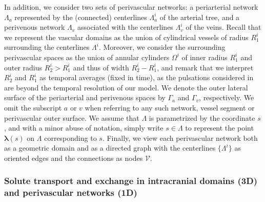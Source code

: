\documentclass[fleqn,10pt]{wlscirep}
\begin{document}
In addition, we consider two sets of perivascular networks: a
periarterial network $\Lambda_a$ represented by the (connected)
centerlines $\Lambda^i_{a}$ of the arterial tree, and a perivenous
network $\Lambda_v$ associated with the centerlines $\Lambda^i_{v}$
of the veins. Recall that we represent the vascular domains as the
union of cylindrical vessels of radius $R_1^i$ surrounding the
centerlines $\Lambda^i$. Moreover, we consider the surrounding
perivascular spaces as the union of annular cylinders $\Omega^i$ of
inner radius $R_1^i$ and outer radius $R_2^i > R_1^i$ and thus of
width $R_2^i - R_1^i$, and remark that we interpret $R^i_2$ and $R^i_1$ as temporal averages (fixed in time), as the pulsations considered in  are beyond the temporal resolution of our model. We denote the outer lateral surface of the
periarterial and perivenous spaces by $\Gamma_a$ and $\Gamma_v$,
respectively. We omit the subscript $a$ or $v$ when referring to any
such network, vessel segment or perivascular outer surface. We assume
that $\Lambda$ is parametrized by the coordinate $s$, and with a minor
abuse of notation, simply write $s \in \Lambda$ to represent the point
${\bm \lambda}(s)$ on $\Lambda$ corresponding to $s$. Finally, we view
each perivascular network both as a geometric domain and as a directed
graph with the centerlines $\{ \Lambda^i \}$ as oriented edges and the
connections as nodes $\mathcal{V}$.

\subsubsection{Solute transport and exchange in intracranial domains (3D) and perivascular networks (1D)}
\label{sec:app:transport_eqs}
\end{document}
